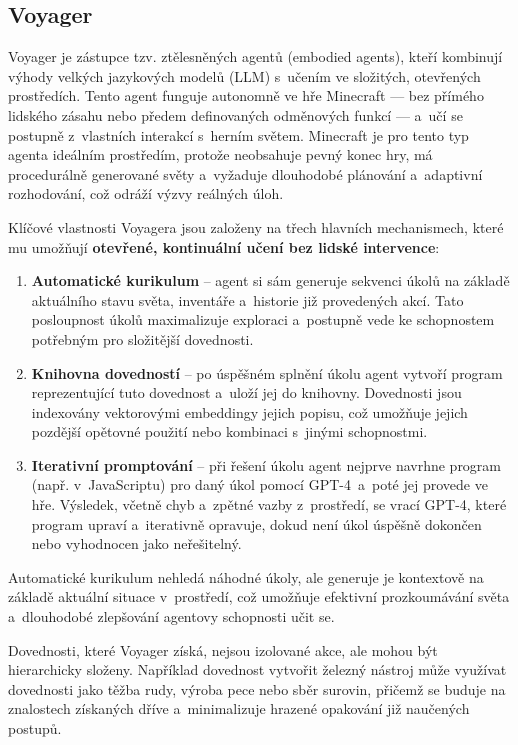 \newpage

\subsection{Voyager}

Voyager\cite{Wangbr} je zástupce tzv. ztělesněných agentů (embodied agents), kteří kombinují výhody velkých jazykových modelů (LLM) s~učením ve složitých, otevřených prostředích. Tento agent funguje autonomně ve hře Minecraft — bez přímého lidského zásahu nebo předem definovaných odměnových funkcí — a~učí se postupně z~vlastních interakcí s~herním světem. Minecraft je pro tento typ agenta ideálním prostředím, protože neobsahuje pevný konec hry, má procedurálně generované světy a~vyžaduje dlouhodobé plánování a~adaptivní rozhodování, což odráží výzvy reálných úloh.

Klíčové vlastnosti Voyagera jsou založeny na třech hlavních mechanismech, které mu umožňují \textbf{otevřené, kontinuální učení bez lidské intervence}:

\begin{enumerate}
    \item \textbf{Automatické kurikulum} – agent si sám generuje sekvenci úkolů na základě aktuálního stavu světa, inventáře a~historie již provedených akcí. Tato posloupnost úkolů maximalizuje exploraci a~postupně vede ke schopnostem potřebným pro složitější dovednosti.
    \item \textbf{Knihovna dovedností} – po úspěšném splnění úkolu agent vytvoří program reprezentující tuto dovednost a~uloží jej do knihovny. Dovednosti jsou indexovány vektorovými embeddingy jejich popisu, což umožňuje jejich pozdější opětovné použití nebo kombinaci s~jinými schopnostmi.
    \item \textbf{Iterativní promptování} – při řešení úkolu agent nejprve navrhne program (např. v~JavaScriptu) pro daný úkol pomocí GPT-4~a~poté jej provede ve hře. Výsledek, včetně chyb a~zpětné vazby z~prostředí, se vrací GPT-4, které program upraví a~iterativně opravuje, dokud není úkol úspěšně dokončen nebo vyhodnocen jako neřešitelný.
\end{enumerate}

Automatické kurikulum nehledá náhodné úkoly, ale generuje je kontextově na základě aktuální situace v~prostředí, což umožňuje efektivní prozkoumávání světa a~dlouhodobé zlepšování agentovy schopnosti učit se.

Dovednosti, které Voyager získá, nejsou izolované akce, ale mohou být hierarchicky složeny. Například dovednost vytvořit železný nástroj může využívat dovednosti jako těžba rudy, výroba pece nebo sběr surovin, přičemž se buduje na znalostech získaných dříve a~minimalizuje hrazené opakování již naučených postupů.

